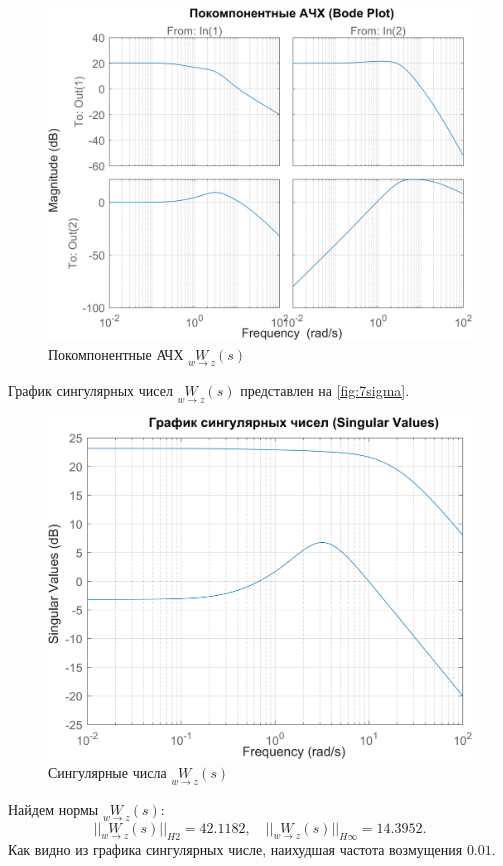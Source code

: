 \begin{figure}[H]
    \centering
    \includegraphics[width=0.8\linewidth]{figs/7_bodemag.png}
    \caption{Покомпонентные АЧХ $\underset{w\rightarrow z}{W}(s)$}
    \label{fig:7bodemag}
\end{figure}
График сингулярных чисел $\underset{w\rightarrow z}{W}(s)$ представлен на \autoref{fig:7sigma}.
\begin{figure}[H]
    \centering
    \includegraphics[width=0.8\linewidth]{figs/7_sigma.png} 
    \caption{Сингулярные числа $\underset{w\rightarrow z}{W}(s)$}
    \label{fig:7sigma}
\end{figure}
\noindent Найдем нормы $\underset{w\rightarrow z}{W}(s)$:
\begin{equation*}
    ||\underset{w\rightarrow z}{W}(s)||_{H2}=42.1182,\quad
    ||\underset{w\rightarrow z}{W}(s)||_{H\infty}=14.3952.
\end{equation*}
Как видно из графика сингулярных числе, наихудшая частота возмущения $0.01$.
